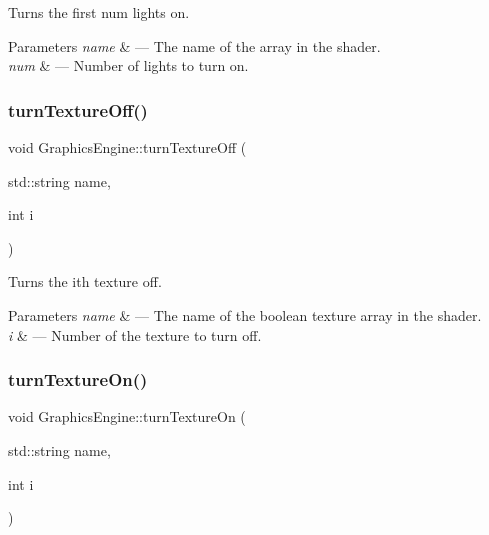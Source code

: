 Turns the first num lights on. 


\begin{DoxyParams}{Parameters}
{\em name} & --- The name of the array in the shader.\\
\hline
{\em num} & --- Number of lights to turn on. \\
\hline
\end{DoxyParams}
\mbox{\label{class_graphics_engine_a26a9223f0a99980ca872a3dc0ab940e4}} 
\subsubsection{\texorpdfstring{turn\+Texture\+Off()}{turnTextureOff()}}
{\footnotesize\ttfamily void Graphics\+Engine\+::turn\+Texture\+Off (\begin{DoxyParamCaption}\item[{std\+::string}]{name,  }\item[{int}]{i }\end{DoxyParamCaption})}



Turns the ith texture off. 


\begin{DoxyParams}{Parameters}
{\em name} & --- The name of the boolean texture array in the shader.\\
\hline
{\em i} & --- Number of the texture to turn off. \\
\hline
\end{DoxyParams}
\mbox{\label{class_graphics_engine_a87f26e8a7fb01b6e317ced365cda1e80}} 
\subsubsection{\texorpdfstring{turn\+Texture\+On()}{turnTextureOn()}}
{\footnotesize\ttfamily void Graphics\+Engine\+::turn\+Texture\+On (\begin{DoxyParamCaption}\item[{std\+::string}]{name,  }\item[{int}]{i }\end{DoxyParamCaption})}



